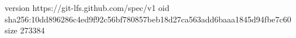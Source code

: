 version https://git-lfs.github.com/spec/v1
oid sha256:10dd896286c4ed9f92c56bf780857beb18d27ca563add6baaa1845d94fbe7c60
size 273384
